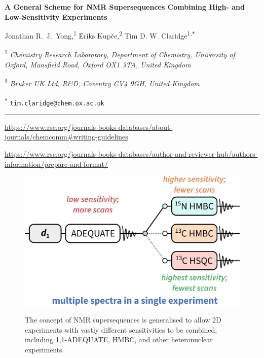 \documentclass[a4paper,12pt]{article}
\newcommand{\me}{Jonathan R.\ J.\ Yong}
\newcommand{\eriks}{{\=E}riks Kup{\v{c}}e}
\newcommand{\tim}{Tim D. W. Claridge}
\newcommand{\articletitle}{A General Scheme for NMR Supersequences Combining High- and Low-Sensitivity Experiments}
\newcommand{\crl}{Chemistry Research Laboratory, Department of Chemistry, University of Oxford, Mansfield Road, Oxford OX1 3TA, United Kingdom}
\newcommand{\turing}{The Alan Turing Institute, The British Library, 96 Euston Road, London NW1 2DB, United Kingdom}
\newcommand{\brukeruk}{Bruker UK Ltd, R\&D, Coventry CV4 9GH, United Kingdom}
\newcommand{\exscientia}{Exscientia Ltd, The Schr{\"o}dinger Building, Oxford Science Park, Oxford OX4 4GE, United Kingdom}
\newcommand{\nitrogen}{\ch{^{15}N}}
\begin{document}
 \begin{refsection}

\begin{center}   %
    \textbf{\Large \articletitle{}}

    \vspace{0.2cm}

    \me{},\textsuperscript{1} \eriks{},\textsuperscript{2} \tim\textsuperscript{1,\texttt{*}}

    \vspace{0.2cm}

    \small

    \textsuperscript{1} \textit{\crl{}}


    \textsuperscript{2} \textit{\brukeruk{}}


    \normalsize \textsuperscript{\texttt{*}} \texttt{tim.claridge@chem.ox.ac.uk}

    \vspace{0.5cm} \hrule

\end{center}

\small{
    \url{https://www.rsc.org/journals-books-databases/about-journals/chemcomm#writing-guidelines}

    \url{https://www.rsc.org/journals-books-databases/author-and-reviewer-hub/authors-information/prepare-and-format/}
}

\begin{figure}[ht]
    \centering\includegraphics{toc.png}%

    The concept of NMR supersequences is generalised to allow 2D experiments with vastly different sensitivities to be combined, including 1,1-ADEQUATE, \nitrogen{} HMBC, and other heteronuclear experiments.
\end{figure}


\end{refsection}
\end{document}
